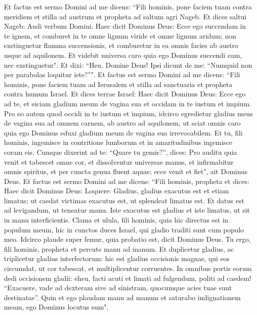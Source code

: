 \begin{biblechapter}  
\verse Et factus est sermo Domini ad me dicens: 
\verse “Fili hominis, pone faciem tuam contra meridiem et stilla ad austrum et propheta ad saltum agri Nageb. 
\verse Et dices saltui Nageb: Audi verbum Domini. Haec dicit Dominus Deus: Ecce ego succendam in te ignem, et comburet in te omne lignum viride et omne lignum aridum; non exstinguetur flamma succensionis, et comburetur in ea omnis facies ab austro usque ad aquilonem. 
\verse Et videbit universa caro quia ego Domínus succendi eam, nec exstinguetur". 
\verse Et dixi: “Heu, Domine Deus! Ipsi dicunt de me: “Numquid non per parabolas loquitur iste?”". 
\verse Et factus est sermo Domini ad me dicens: 
\verse “Fili hominis, pone faciem tuam ad Ierusalem et stilla ad sanctuaria et propheta contra humum Israel. 
\verse Et dices terrae Israel: Haec dicit Dominus Deus: Ecce ego ad te, et eiciam gladium meum de vagina sua et occidam in te iustum et impium. 
\verse Pro eo autem quod occidi in te iustum et impium, idcirco egredietur gladius meus de vagina sua ad omnem carnem, ab austro ad aquilonem, 
\verse ut sciat omnis caro quia ego Dominus eduxi gladium meum de vagina sua irrevocabilem. 
\verse Et tu, fili hominis, ingemisce in contritione lumborum et in amaritudinibus ingemisce coram eis. 
\verse Cumque dixerint ad te: “Quare tu gemis?”, dices: Pro auditu quia venit et tabescet omne cor, et dissolventur universae manus, et infirmabitur omnis spiritus, et per cuncta genua fluent aquae; ecce venit et fiet", ait Dominus Deus. 
\verse Et factus est sermo Domini ad me dicens: 
\verse “Fili hominis, propheta et dices: Haec dicit Dominus Deus: Loquere: Gladius, gladius exacutus est et etiam limatus; 
\verse ut caedat victimas exacutus est, ut splendeat limatus est. 
\verse Et datus est ad levigandum, ut teneatur manu. Iste exacutus est gladius et iste limatus, ut sit in manu interficientis. 
\verse Clama et ulula, fili hominis, quia hic directus est in populum meum, hic in cunctos duces Israel, qui gladio traditi sunt cum populo meo. 
\verse Idcirco plaude super femur, quia probatio est, dicit Dominus Deus. 
\verse Tu ergo, fili hominis, propheta et percute manu ad manum. Et duplicetur gladius, ac triplicetur gladius interfectorum: hic est gladius occisionis magnae, qui eos circumdat, 
\verse ut cor tabescat, et multiplicentur corruentes. In omnibus portis eorum dedi occisionem gladii: eheu, facti acuti et limati ad fulgendum, politi ad caedem! 
\verse “Exacuere, vade ad dexteram sive ad sinistram, quocumque acies tuae sunt destinatae”. 
\verse Quin et ego plaudam manu ad manum et saturabo indignationem meam, ego Dominus locutus sum". 

\end{biblechapter}
